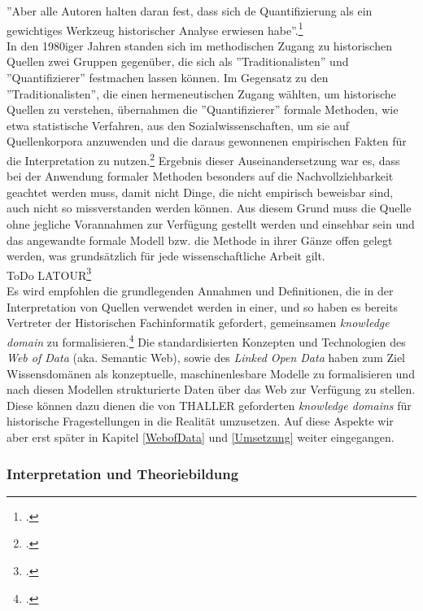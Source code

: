 \documentclass[12pt,a4paper]{article}
\begin{document}
''Aber alle Autoren halten daran fest, dass sich de Quantifizierung als ein gewichtiges Werkzeug historischer Analyse erwiesen habe''.\footcite[][S.191-206]{jarausch1985quantitative}
\\
In den 1980iger Jahren standen sich im methodischen Zugang zu historischen Quellen zwei Gruppen gegenüber, die sich als ''Traditionalisten'' und ''Quantifizierer'' festmachen lassen können. Im Gegensatz zu den ''Traditionalisten'', die einen hermeneutischen Zugang wählten, um historische Quellen zu verstehen, übernahmen die ''Quantifizierer'' formale Methoden, wie etwa statistische Verfahren, aus den Sozialwissenschaften, um sie auf Quellenkorpora anzuwenden und die daraus gewonnenen empirischen Fakten für die Interpretation zu nutzen.\footcite[][S.XX-XX]{jarausch1985quantitative} Ergebnis dieser Auseinandersetzung war es, dass bei der Anwendung formaler Methoden besonders auf die Nachvollziehbarkeit geachtet werden muss, damit nicht Dinge, die nicht empirisch beweisbar sind, auch nicht so missverstanden werden können. Aus diesem Grund muss die Quelle ohne jegliche Vorannahmen zur Verfügung gestellt werden und einsehbar sein und das angewandte formale Modell bzw. die Methode in ihrer Gänze offen gelegt werden, was grundsätzlich für jede wissenschaftliche Arbeit gilt. 
\\
ToDo LATOUR\footcite{latour2016zirkulierende}
\\
Es wird empfohlen die grundlegenden Annahmen und Definitionen, die in der Interpretation von Quellen verwendet werden in einer, und so haben es bereits Vertreter der Historischen Fachinformatik gefordert, gemeinsamen \textit{knowledge domain} zu formalisieren.\footcite[][S.XX-XX]{thaller2017historical} Die standardisierten Konzepten und Technologien des \textit{Web of Data} (aka. Semantic Web), sowie des \textit{Linked Open Data} haben zum Ziel Wissensdomänen als konzeptuelle, maschinenlesbare Modelle zu formalisieren und nach diesen Modellen strukturierte Daten über das Web zur Verfügung zu stellen. Diese können dazu dienen die von THALLER geforderten \textit{knowledge domains} für historische Fragestellungen in die Realität umzusetzen. Auf diese Aspekte wir aber erst später in Kapitel \ref{WebofData} und \ref{Umsetzung} weiter eingegangen.

\subsubsection{Interpretation und Theoriebildung}
\end{document}
